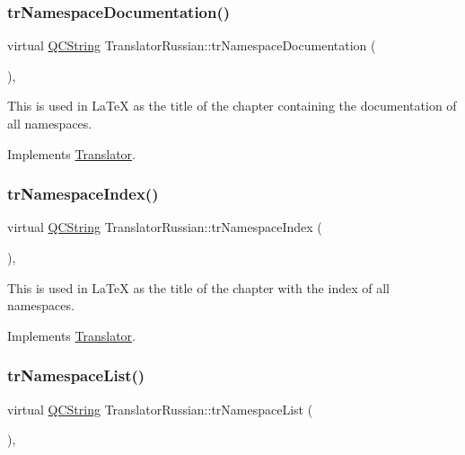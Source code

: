 \subsubsection{\texorpdfstring{trNamespaceDocumentation()}{trNamespaceDocumentation()}}
{\footnotesize\ttfamily virtual \mbox{\hyperlink{class_q_c_string}{Q\+C\+String}} Translator\+Russian\+::tr\+Namespace\+Documentation (\begin{DoxyParamCaption}{ }\end{DoxyParamCaption})\hspace{0.3cm}{\ttfamily [inline]}, {\ttfamily [virtual]}}

This is used in La\+TeX as the title of the chapter containing the documentation of all namespaces. 

Implements \mbox{\hyperlink{class_translator}{Translator}}.

\mbox{\label{class_translator_russian_a0c2b9c025d5cd3edc0e4a8f9bec8d078}} 
\subsubsection{\texorpdfstring{trNamespaceIndex()}{trNamespaceIndex()}}
{\footnotesize\ttfamily virtual \mbox{\hyperlink{class_q_c_string}{Q\+C\+String}} Translator\+Russian\+::tr\+Namespace\+Index (\begin{DoxyParamCaption}{ }\end{DoxyParamCaption})\hspace{0.3cm}{\ttfamily [inline]}, {\ttfamily [virtual]}}

This is used in La\+TeX as the title of the chapter with the index of all namespaces. 

Implements \mbox{\hyperlink{class_translator}{Translator}}.

\mbox{\label{class_translator_russian_a837cdd8589b81c6fc5fbe78871590645}} 
\subsubsection{\texorpdfstring{trNamespaceList()}{trNamespaceList()}}
{\footnotesize\ttfamily virtual \mbox{\hyperlink{class_q_c_string}{Q\+C\+String}} Translator\+Russian\+::tr\+Namespace\+List (\begin{DoxyParamCaption}{ }\end{DoxyParamCaption})\hspace{0.3cm}{\ttfamily [inline]}, {\ttfamily [virtual]}}

